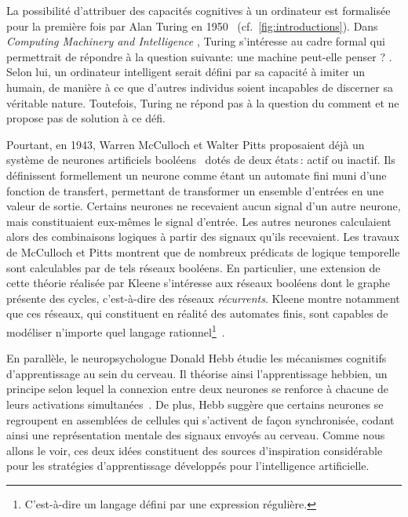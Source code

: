 La possibilité d'attribuer des capacités cognitives à un ordinateur est formalisée pour la première fois par Alan Turing en 1950~\cite{turing_computing_1950} (cf.~\cref{fig:introductions}). Dans \og \emph{Computing Machinery and Intelligence} \fg, Turing s'intéresse au cadre formal qui permettrait de répondre à la question suivante: \og{} une machine peut-elle penser ? \fg{}. Selon lui, un ordinateur intelligent serait défini par sa capacité à imiter un humain, de manière à ce que d'autres individus soient incapables de discerner sa véritable nature. Toutefois, Turing ne répond pas à la question du \og comment \fg{} et ne propose pas de solution à ce défi.

Pourtant, en 1943, Warren McCulloch et Walter Pitts proposaient déjà un système de neurones artificiels booléens~\cite{mcculloch_logical_1943} dotés de deux états\,: actif ou inactif. Ils définissent formellement un neurone comme étant un automate fini muni d'une fonction de transfert, permettant de transformer un ensemble d'entrées en une valeur de sortie. Certains neurones ne recevaient aucun signal d'un autre neurone, mais constituaient eux-mêmes le signal d'entrée. Les autres neurones calculaient alors des combinaisons logiques à partir des signaux qu'ils recevaient. Les travaux de McCulloch et Pitts montrent que de nombreux prédicats de logique temporelle sont calculables par de tels réseaux booléens. En particulier, une extension de cette théorie réalisée par Kleene s'intéresse aux réseaux booléens dont le graphe présente des cycles, c'est-à-dire des réseaux \emph{récurrents}. Kleene montre notamment que ces réseaux, qui constituent en réalité des automates finis, sont capables de modéliser n'importe quel langage rationnel\footnote{C'est-à-dire un langage défini par une expression régulière.}~\cite{kleene_representation_1956}.

En parallèle, le neuropsychologue Donald Hebb étudie les mécanismes cognitifs d'apprentissage au sein du cerveau. Il théorise ainsi l'apprentissage hebbien, un principe selon lequel la connexion entre deux neurones se renforce à chacune de leurs activations simultanées~\cite{hebb_organization_1949}. De plus, Hebb suggère que certains neurones se regroupent en \og{} assemblées de cellules \fg{} qui s'activent de façon synchronisée, codant ainsi une représentation mentale des signaux envoyés au cerveau. Comme nous allons le voir, ces deux idées constituent des sources d'inspiration considérable pour les stratégies d'apprentissage développés pour l'intelligence artificielle.


